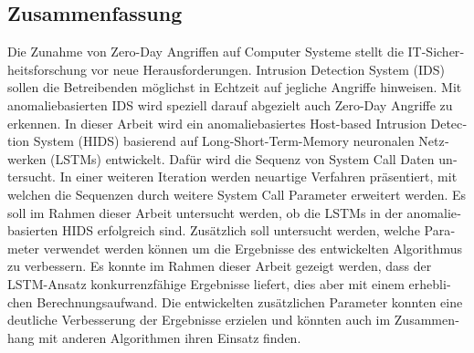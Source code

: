 \begin{otherlanguage}{ngerman}
\chapter*{Zusammenfassung}
Die Zunahme von Zero-Day Angriffen auf Computer Systeme stellt die IT-Sicherheitsforschung vor neue Herausforderungen.
Intrusion Detection System (IDS) sollen die Betreibenden möglichst in Echtzeit auf jegliche Angriffe hinweisen.
Mit anomaliebasierten IDS wird speziell darauf abgezielt auch Zero-Day Angriffe zu erkennen.
In dieser Arbeit wird ein anomaliebasiertes Host-based Intrusion Detection System (HIDS) basierend auf Long-Short-Term-Memory neuronalen Netzwerken (LSTMs) entwickelt.
Dafür wird die Sequenz von System Call Daten untersucht.
In einer weiteren Iteration werden neuartige Verfahren präsentiert, mit welchen die Sequenzen durch weitere System Call Parameter erweitert werden.
Es soll im Rahmen dieser Arbeit untersucht werden, ob die LSTMs in der anomaliebasierten HIDS erfolgreich sind.
Zusätzlich soll untersucht werden, welche Parameter verwendet werden können um die Ergebnisse des entwickelten Algorithmus zu verbessern.
Es konnte im Rahmen dieser Arbeit gezeigt werden, dass der LSTM-Ansatz konkurrenzfähige Ergebnisse liefert, dies aber mit einem erheblichen Berechnungsaufwand.
Die entwickelten zusätzlichen Parameter konnten eine deutliche Verbesserung der Ergebnisse erzielen und könnten auch im Zusammenhang mit anderen Algorithmen ihren Einsatz finden.
\end{otherlanguage}

\endgroup

\vfill
